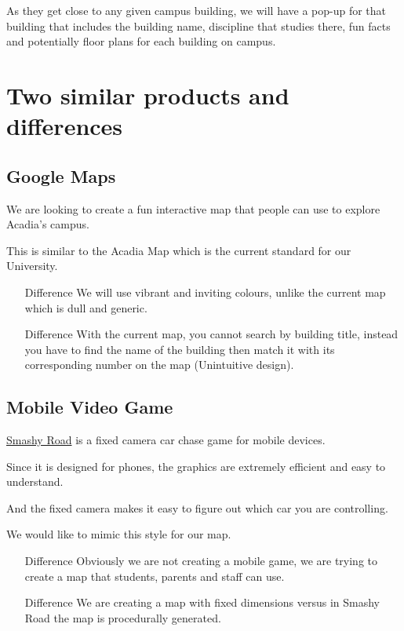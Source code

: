 \documentclass[ansiapaper,12pt]{article}
\begin{document}
As they get close to any given campus building,
we will have a pop-up for that building that includes the building name,
discipline that studies there,
fun facts and potentially floor plans for each building on campus.

\section{Two similar products and differences}

\subsection{Google Maps}


We are looking to create a fun interactive map that people can use to explore Acadia’s campus.

This is similar to the Acadia Map which is the current standard for our University.

\begin{itemize}
    \item[Difference] We will use vibrant and inviting colours, unlike the current map which is dull and generic.
    \item[Difference] With the current map, you cannot search by building title, instead you have to find the name of the building then match it with its corresponding number on the map (Unintuitive design).
\end{itemize}

\subsection{Mobile Video Game}

\href{http://www.bearbitstudios.com/privacy/}{Smashy Road} is a fixed camera car chase game for mobile devices.

Since it is designed for phones,
the graphics are extremely efficient and easy to understand.

And the fixed camera makes it easy to figure out which car you are controlling.

We would like to mimic this style for our map.

\begin{itemize}
    \item[Difference] Obviously we are not creating a mobile game, we are trying to create a map that students, parents and staff can use.
    \item[Difference] We are creating a map with fixed dimensions versus in Smashy Road the map is procedurally generated.
\end{itemize}
\end{document}
